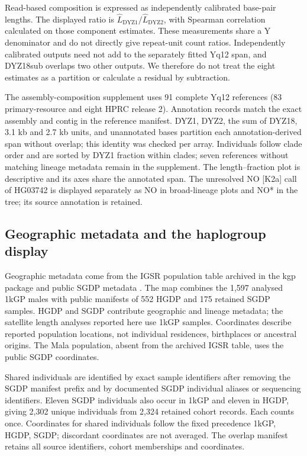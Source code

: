 \documentclass[pdflatex,sn-nature]{sn-jnl}
\begin{document}
Read-based composition is expressed as independently calibrated base-pair lengths. The displayed ratio is $\widehat L_{\mathrm{DYZ1}}/\widehat L_{\mathrm{DYZ2}}$, with Spearman correlation calculated on those component estimates. These measurements share a Y denominator and do not directly give repeat-unit count ratios. Independently calibrated outputs need not add to the separately fitted Yq12 span, and DYZ18sub overlaps two other outputs. We therefore do not treat the eight estimates as a partition or calculate a residual by subtraction.

The assembly-composition supplement uses 91 complete Yq12 references (83 primary-resource and eight HPRC release 2). Annotation records match the exact assembly and contig in the reference manifest. DYZ1, DYZ2, the sum of DYZ18, 3.1 kb and 2.7 kb units, and unannotated bases partition each annotation-derived span without overlap; this identity was checked per array. Individuals follow clade order and are sorted by DYZ1 fraction within clades; seven references without matching lineage metadata remain in the supplement. The length--fraction plot is descriptive and its axes share the annotated span. The unresolved NO [K2a] call of HG03742 is displayed separately as NO in broad-lineage plots and NO* in the tree; its source annotation is retained.



\subsection{Geographic metadata and the haplogroup display}\label{sec:m-geography}
Geographic metadata come from the IGSR population table archived in the kgp package and public SGDP metadata \cite{Bergstrom2020,Mallick2016}. The map combines the 1,597 analysed 1kGP males with public manifests of 552 HGDP and 175 retained SGDP samples. HGDP and SGDP contribute geographic and lineage metadata; the satellite length analyses reported here use 1kGP samples. Coordinates describe reported population locations, not individual residences, birthplaces or ancestral origins. The Mala population, absent from the archived IGSR table, uses the public SGDP coordinates.

Shared individuals are identified by exact sample identifiers after removing the SGDP manifest prefix and by documented SGDP individual aliases or sequencing identifiers. Eleven SGDP individuals also occur in 1kGP and eleven in HGDP, giving 2,302 unique individuals from 2,324 retained cohort records. Each counts once. Coordinates for shared individuals follow the fixed precedence 1kGP, HGDP, SGDP; discordant coordinates are not averaged. The overlap manifest retains all source identifiers, cohort memberships and coordinates.
\end{document}
